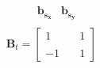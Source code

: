 \documentclass[preview]{standalone}
\begin{document}
\begin{align*}
\begin{array}{c}\begin{matrix}\hspace{1cm} \mathbf{b_{s_x}} & \mathbf{b_{s_y}} \end{matrix} \\  \mathbf{B}_t = \begin{bmatrix} 1 & \quad 1 \\ \\-1 & \quad 1 \end{bmatrix} \end{array}
\end{align*}
\end{document}
